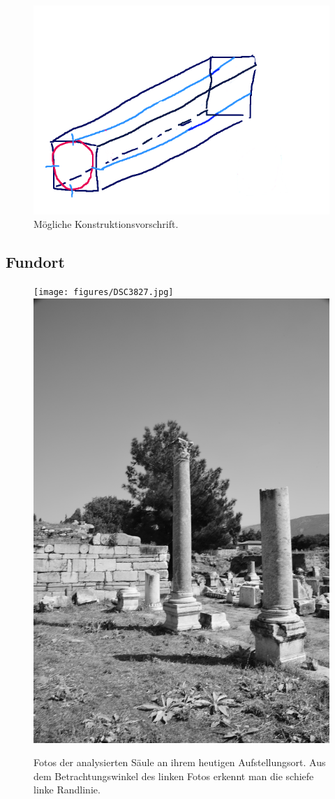 \documentclass[twocolumn]{bmcart}
\begin{document}
\begin{figure}[h]
\centering
\includegraphics[width=1\linewidth]{figures/Konstruktionsidee.png}
\caption{Mögliche Konstruktionsvorschrift.}
\label{fig:construction}
\end{figure}



\subsection{Fundort}

\begin{figure}[h]
	\centering
	\texttt{[image: figures/DSC3827.jpg]}
	\includegraphics[width=0.7\linewidth]{figures/d1.JPG}
	\caption{Fotos der analysierten Säule an ihrem heutigen Aufstellungsort. Aus dem Betrachtungswinkel des linken Fotos erkennt man die schiefe linke Randlinie.}
	\label{dsc3827}
\end{figure}
\end{document}
